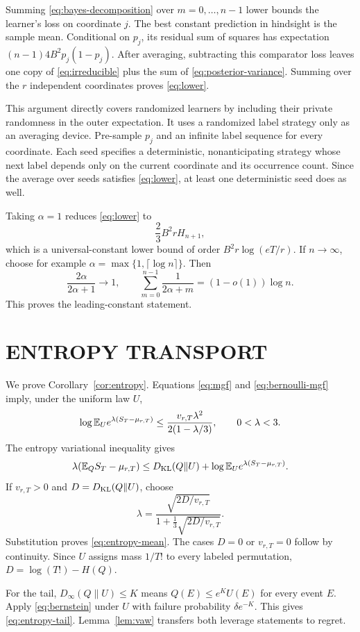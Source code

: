 Summing \eqref{eq:bayes-decomposition} over $m=0,\ldots,n-1$ lower bounds the learner's loss on coordinate $j$. The best constant prediction in hindsight is the sample mean. Conditional on $p_j$, its residual sum of squares has expectation
$(n-1)4B^2p_j(1-p_j)$. After averaging, subtracting this comparator loss leaves one copy of \eqref{eq:irreducible} plus the sum of \eqref{eq:posterior-variance}. Summing over the $r$ independent coordinates proves \eqref{eq:lower}.

This argument directly covers randomized learners by including their private randomness in the outer expectation. It uses a randomized label strategy only as an averaging device. Pre-sample $p_j$ and an infinite label sequence for every coordinate. Each seed specifies a deterministic, nonanticipating strategy whose next label depends only on the current coordinate and its occurrence count. Since the average over seeds satisfies \eqref{eq:lower}, at least one deterministic seed does as well.

Taking $\alpha=1$ reduces \eqref{eq:lower} to
\[
 \frac23B^2rH_{n+1},
\]
which is a universal-constant lower bound of order
$B^2r\log(eT/r)$. If $n\to\infty$, choose for example
$\alpha=\max\{1,\lceil\log n\rceil\}$. Then
\[
 \frac{2\alpha}{2\alpha+1}\to1,
 \qquad
 \sum_{m=0}^{n-1}\frac1{2\alpha+m}
 =(1-o(1))\log n.
\]
This proves the leading-constant statement.

\section{ENTROPY TRANSPORT}
\label{app:entropy}

We prove Corollary~\ref{cor:entropy}. Equations \eqref{eq:mgf} and \eqref{eq:bernoulli-mgf} imply, under the uniform law $U$,
\begin{equation}
 \log\mathbb E_U e^{\lambda(S_T-\mu_{r,T})}
 \le\frac{v_{r,T}\lambda^2}{2(1-\lambda/3)},
 \qquad 0<\lambda<3.
 \label{eq:subgamma}
\end{equation}
The entropy variational inequality gives
\[
 \lambda(\mathbb E_QS_T-\mu_{r,T})
 \le D_{\mathrm{KL}}(Q\|U)+
 \log\mathbb E_Ue^{\lambda(S_T-\mu_{r,T})}.
\]
If $v_{r,T}>0$ and $D=D_{\mathrm{KL}}(Q\|U)$, choose
\[
 \lambda=\frac{\sqrt{2D/v_{r,T}}}
 {1+\frac13\sqrt{2D/v_{r,T}}}.
\]
Substitution proves \eqref{eq:entropy-mean}. The cases $D=0$ or $v_{r,T}=0$ follow by continuity. Since $U$ assigns mass $1/T!$ to every labeled permutation,
$D=\log(T!)-H(Q)$.

For the tail, $D_\infty(Q\|U)\le K$ means
$Q(E)\le e^KU(E)$ for every event $E$. Apply \eqref{eq:bernstein} under $U$ with failure probability $\delta e^{-K}$. This gives \eqref{eq:entropy-tail}. Lemma~\ref{lem:vaw} transfers both leverage statements to regret.

